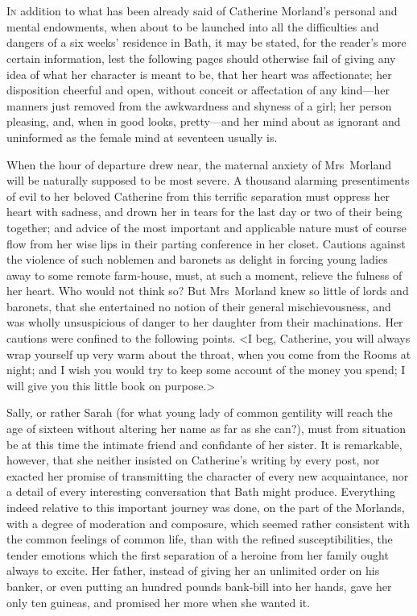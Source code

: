 \chapter[Chapter \thechapter]{}

 \lettrine{I}{n} addition to what has been already said of Catherine Morland's personal and mental endowments, when about to be launched into all the difficulties and dangers of a six weeks' residence in Bath, it may be stated, for the reader's more certain information, lest the following pages should otherwise fail of giving any idea of what her character is meant to be, that her heart was affectionate; her disposition cheerful and open, without conceit or affectation of any kind—her manners just removed from the awkwardness and shyness of a girl; her person pleasing, and, when in good looks, pretty—and her mind about as ignorant and uninformed as the female mind at seventeen usually is. 

 When the hour of departure drew near, the maternal anxiety of Mrs~Morland will be naturally supposed to be most severe. A thousand alarming presentiments of evil to her beloved Catherine from this terrific separation must oppress her heart with sadness, and drown her in tears for the last day or two of their being together; and advice of the most important and applicable nature must of course flow from her wise lips in their parting conference in her closet. Cautions against the violence of such noblemen and baronets as delight in forcing young ladies away to some remote farm-house, must, at such a moment, relieve the fulness of her heart. Who would not think so? But Mrs~Morland knew so little of lords and baronets, that she entertained no notion of their general mischievousness, and was wholly unsuspicious of danger to her daughter from their machinations. Her cautions were confined to the following points. <I beg, Catherine, you will always wrap yourself up very warm about the throat, when you come from the Rooms at night; and I wish you would try to keep some account of the money you spend; I will give you this little book on purpose.> 

 Sally, or rather Sarah (for what young lady of common gentility will reach the age of sixteen without altering her name as far as she can?), must from situation be at this time the intimate friend and confidante of her sister. It is remarkable, however, that she neither insisted on Catherine's writing by every post, nor exacted her promise of transmitting the character of every new acquaintance, nor a detail of every interesting conversation that Bath might produce. Everything indeed relative to this important journey was done, on the part of the Morlands, with a degree of moderation and composure, which seemed rather consistent with the common feelings of common life, than with the refined susceptibilities, the tender emotions which the first separation of a heroine from her family ought always to excite. Her father, instead of giving her an unlimited order on his banker, or even putting an hundred pounds bank-bill into her hands, gave her only ten guineas, and promised her more when she wanted it. 

